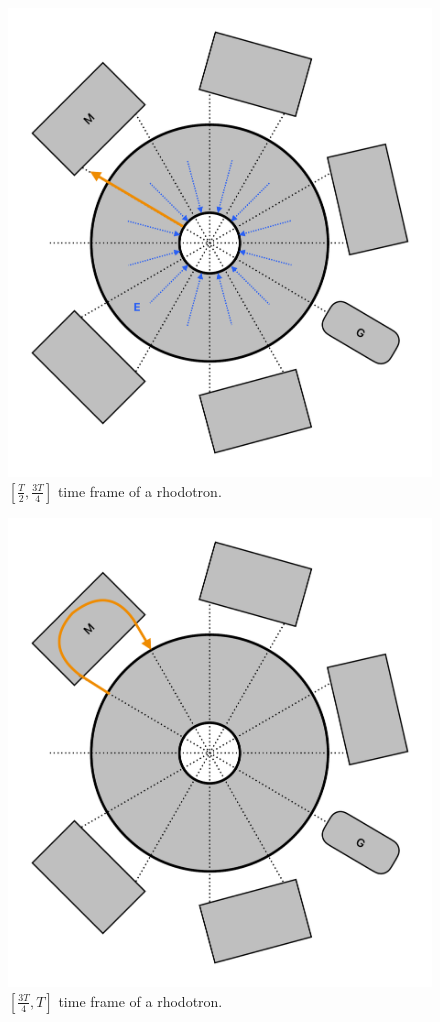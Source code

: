 \documentclass{article}
\begin{document}
\begin{figure}[H]
    \centering
    \includegraphics[width=\textwidth]{../../../figures/illustrations/rhod3.pdf}
    \caption{$[\frac{T}{2}, \frac{3T}{4}]$ time frame of a rhodotron.}
    \label{fig:rhod_cycle_3}
\end{figure}
\begin{figure}[H]
    \centering
    \includegraphics[width=\textwidth]{../../../figures/illustrations/rhod4.pdf}
    \caption{$[\frac{3T}{4}, T]$ time frame of a rhodotron.}
    \label{fig:rhod_cycle_4}
\end{figure}
\end{document}
